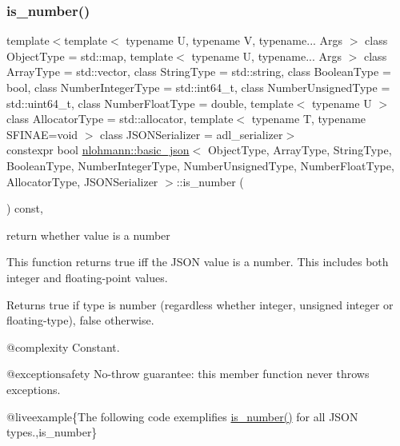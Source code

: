 \subsubsection{\texorpdfstring{is\_number()}{is\_number()}}
{\footnotesize\ttfamily template$<$template$<$ typename U, typename V, typename... Args $>$ class Object\+Type = std\+::map, template$<$ typename U, typename... Args $>$ class Array\+Type = std\+::vector, class String\+Type  = std\+::string, class Boolean\+Type  = bool, class Number\+Integer\+Type  = std\+::int64\+\_\+t, class Number\+Unsigned\+Type  = std\+::uint64\+\_\+t, class Number\+Float\+Type  = double, template$<$ typename U $>$ class Allocator\+Type = std\+::allocator, template$<$ typename T, typename S\+F\+I\+N\+A\+E=void $>$ class J\+S\+O\+N\+Serializer = adl\+\_\+serializer$>$ \\
constexpr bool \mbox{\hyperlink{classnlohmann_1_1basic__json}{nlohmann\+::basic\+\_\+json}}$<$ Object\+Type, Array\+Type, String\+Type, Boolean\+Type, Number\+Integer\+Type, Number\+Unsigned\+Type, Number\+Float\+Type, Allocator\+Type, J\+S\+O\+N\+Serializer $>$\+::is\+\_\+number (\begin{DoxyParamCaption}{ }\end{DoxyParamCaption}) const\hspace{0.3cm}{\ttfamily [inline]}, {\ttfamily [noexcept]}}



return whether value is a number 

This function returns true iff the J\+S\+ON value is a number. This includes both integer and floating-\/point values.

\begin{DoxyReturn}{Returns}
{\ttfamily true} if type is number (regardless whether integer, unsigned integer or floating-\/type), {\ttfamily false} otherwise.
\end{DoxyReturn}
@complexity Constant.

@exceptionsafety No-\/throw guarantee\+: this member function never throws exceptions.

@liveexample\{The following code exemplifies {\ttfamily \mbox{\hyperlink{classnlohmann_1_1basic__json_a2b9852390abb4b1ef5fac6984e2fc0f3}{is\+\_\+number()}}} for all J\+S\+ON types.,is\+\_\+number\}

